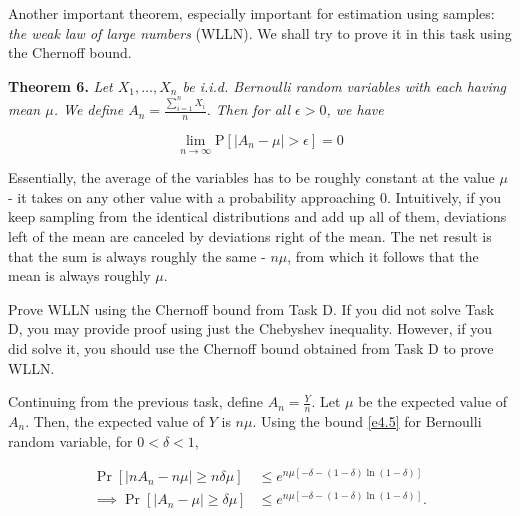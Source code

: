 \begin{tcolorbox}
    Another important theorem, especially important for estimation using samples:
    \textit{the weak law of large numbers} (WLLN). We shall try to prove it in
    this task using the Chernoff bound.

    \vspace{10pt}
    \begin{mdframed}[backgroundcolor=lightyellow, linecolor=darkyellow,
    linewidth=1.5pt]
        \textbf{Theorem 6.}
        \textit{Let $X_1, \ldots, X_n$ be i.i.d. Bernoulli random variables with
        each having mean $\mu$. We define $A_n = \frac{\sum_{i = 1}^{n} X_i}{n}$.
        Then for all $\epsilon > 0$, we have}

        \begin{equation*}
            \lim_{n \xrightarrow{} \infty} \text{P}[|A_n - \mu| > \epsilon] = 0
        \end{equation*}
    \end{mdframed}

    Essentially, the average of the variables has to be roughly constant at the
    value $\mu$ - it takes on any other value with a probability approaching 0.
    Intuitively, if you keep sampling from the identical distributions and add up
    all of them, deviations left of the mean are canceled by deviations right of
    the mean. The net result is that the sum is always roughly the same -
    $n\mu$, from which it follows that the mean is always roughly $\mu$.

    Prove WLLN using the Chernoff bound from Task D. If you did not solve Task D,
    you may provide proof using just the Chebyshev inequality. However, if you did
    solve it, you should use the Chernoff bound obtained from Task D to prove
    WLLN.
\end{tcolorbox}


Continuing from the previous task, define $A_n=\frac{Y}{n}$. Let $\mu$ be the
expected value of $A_n$. Then, the expected value of $Y$ is $n\mu$. Using the
bound \ref{e4.5} for Bernoulli random variable, for $0<\delta<1$,

\begin{equation*}
    \begin{aligned}
        \Pr[|nA_n-n\mu|\ge n\delta\mu] &\le e^{n\mu[-\delta-(1-\delta)
        \ln(1-\delta)]} \\
        \implies \Pr[|A_n-\mu| \ge \delta\mu] &\le 
        e^{n\mu[-\delta-(1-\delta)\ln(1-\delta)]}.
    \end{aligned}
\end{equation*}

